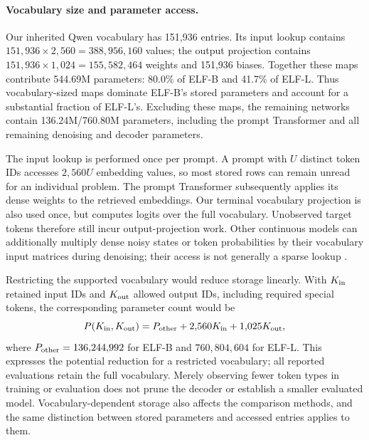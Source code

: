 \paragraph{Vocabulary size and parameter access.}
Our inherited Qwen vocabulary has 151,936 entries. Its input lookup contains $151{,}936\times2{,}560=388{,}956{,}160$ values; the output projection contains $151{,}936\times1{,}024=155{,}582{,}464$ weights and 151,936 biases. Together these maps contribute 544.69M parameters: 80.0\% of ELF-B and 41.7\% of ELF-L. Thus vocabulary-sized maps dominate ELF-B's stored parameters and account for a substantial fraction of ELF-L's. Excluding these maps, the remaining networks contain 136.24M/760.80M parameters, including the prompt Transformer and all remaining denoising and decoder parameters.

The input lookup is performed once per prompt. A prompt with $U$ distinct token IDs accesses $2{,}560U$ embedding values, so most stored rows can remain unread for an individual problem. The prompt Transformer subsequently applies its dense weights to the retrieved embeddings. Our terminal vocabulary projection is also used once, but computes logits over the full vocabulary. Unobserved target tokens therefore still incur output-projection work. Other continuous models can additionally multiply dense noisy states or token probabilities by their vocabulary input matrices during denoising; their access is not generally a sparse lookup \citep{posterior,tess2,mlfm}.

Restricting the supported vocabulary would reduce storage linearly. With $K_{\rm in}$ retained input IDs and $K_{\rm out}$ allowed output IDs, including required special tokens, the corresponding parameter count would be
\begin{equation}
 P(K_{\rm in},K_{\rm out})=P_{\rm other}+2{,}560K_{\rm in}+1{,}025K_{\rm out},
\end{equation}
where $P_{\rm other}=136{,}244{,}992$ for ELF-B and $760{,}804{,}604$ for ELF-L. This expresses the potential reduction for a restricted vocabulary; all reported evaluations retain the full vocabulary. Merely observing fewer token types in training or evaluation does not prune the decoder or establish a smaller evaluated model. Vocabulary-dependent storage also affects the comparison methods, and the same distinction between stored parameters and accessed entries applies to them.

